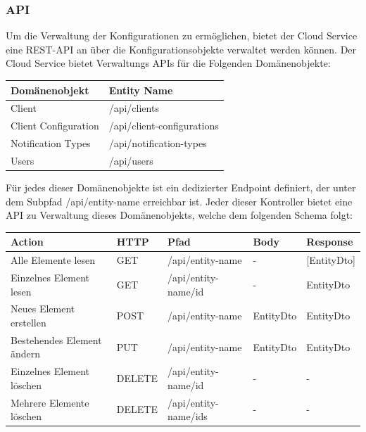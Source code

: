 \clearpage

\subsubsection{API}

Um die Verwaltung der Konfigurationen zu ermöglichen, bietet der Cloud Service eine REST-API an über die Konfigurationsobjekte verwaltet werden können.
Der Cloud Service bietet Verwaltungs APIs für die Folgenden Domänenobjekte:

\begin{table}[h]
    \centering
    \begin{tabular}{|l|p{13cm}|}
        \hline
        \textbf{Domänenobjekt} & \textbf{Entity Name} \\
        \hline
        Client         & /api/clients \\
        \hline
        Client Configuration         & /api/client-configurations \\
        \hline
        Notification Types         & /api/notification-types \\
        \hline
        Users         & /api/users \\
        \hline
    \end{tabular}\label{tab:adminapimethods}
\end{table}

Für jedes dieser Domänenobjekte ist ein dedizierter Endpoint definiert, der unter dem Subpfad /api/entity-name erreichbar ist.
Jeder dieser Kontroller bietet eine API zu Verwaltung dieses Domänenobjekts, welche dem folgenden Schema folgt:

\begin{tabular}{|p{7.3cm}|l|l|l|l|}
    \hline
    \textbf{Action} & \textbf{HTTP} & \textbf{Pfad} & \textbf{Body} & \textbf{Response} \\
    \hline
        Alle Elemente lesen         & GET & /api/entity-name & - & [EntityDto] \\
    \hline
        Einzelnes Element lesen         & GET & /api/entity-name/id & - & EntityDto \\
    \hline
        Neues Element erstellen         & POST & /api/entity-name  & EntityDto & EntityDto\\
    \hline
        Bestehendes Element ändern          & PUT & /api/entity-name  & EntityDto & EntityDto\\
    \hline
        Einzelnes Element löschen          & DELETE & /api/entity-name/id  & - & -  \\
    \hline
        Mehrere Elemente löschen          & DELETE & /api/entity-name/ids  & - & - \\
    \hline
\end{tabular}\label{tab:apimethods}

